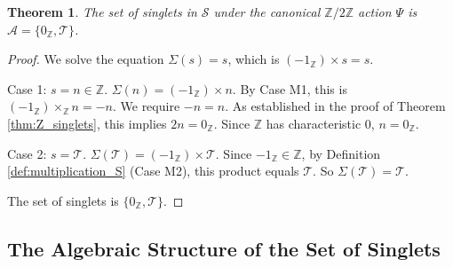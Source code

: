 \documentclass[11pt, a4paper]{article}
\theoremstyle{plain}
\newtheorem{theorem}{Theorem}[section]
\theoremstyle{definition}
\numberwithin{equation}{section}
\newcommand{\Z}{\mathbb{Z}}
\newcommand{\Tobj}{\mathcal{T}} %
\newcommand{\SemiringS}{\mathcal{S}}
\newcommand{\Ztwo}{\mathbb{Z}/2\mathbb{Z}}
\newcommand{\SetA}{\mathcal{A}}
\begin{document}
\begin{theorem}\label{thm:singlets_S}
The set of singlets in $\SemiringS$ under the canonical $\Ztwo$ action $\Psi$ is $\SetA = \{0_{\Z}, \Tobj\}$.
\end{theorem}
\begin{proof}
We solve the equation $\Sigma(s)=s$, which is $(-1_{\Z}) \times s = s$.

Case 1: $s=n \in \Z$.
$\Sigma(n) = (-1_{\Z})\times n$. By Case M1, this is $(-1_{\Z})\times_{\Z} n = -n$.
We require $-n=n$. As established in the proof of Theorem \ref{thm:Z_singlets}, this implies $2n=0_{\Z}$. Since $\Z$ has characteristic 0, $n=0_{\Z}$.

Case 2: $s=\Tobj$.
$\Sigma(\Tobj) = (-1_{\Z}) \times \Tobj$.
Since $-1_{\Z} \in \Z$, by Definition \ref{def:multiplication_S} (Case M2), this product equals $\Tobj$.
So $\Sigma(\Tobj)=\Tobj$.

The set of singlets is $\{0_{\Z}, \Tobj\}$.
\end{proof}

\subsection{The Algebraic Structure of the Set of Singlets}
\end{document}
